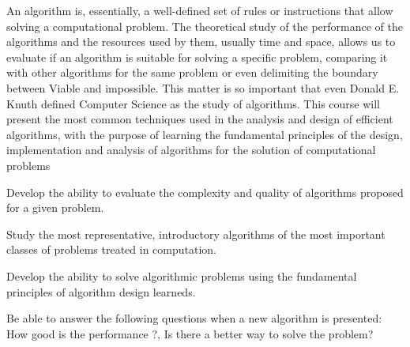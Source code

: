 \begin{syllabus}


\begin{justification}
An algorithm is, essentially, a well-defined set of rules or instructions that allow solving a computational problem.
The theoretical study of the performance of the algorithms and the resources used by them, usually time and space, allows us to evaluate if an algorithm is suitable for solving a specific problem, comparing it with other algorithms for the same problem or even delimiting the boundary between Viable and impossible.
This matter is so important that even Donald E. Knuth defined Computer Science as the study of algorithms.
This course will present the most common techniques used in the analysis and design of efficient algorithms,
with the purpose of learning the fundamental principles of the design, implementation and analysis of algorithms for the solution of computational problems
\end{justification}

\begin{goals} 
\item Develop the ability to evaluate the complexity and quality of algorithms proposed for a given problem.
\item Study the most representative, introductory algorithms of the most important classes of problems treated in computation.
\item Develop the ability to solve algorithmic problems using the fundamental principles of algorithm design learneds.
\item Be able to answer the following questions when a new algorithm is presented: How good is the performance ?, Is there a better way to solve the problem?
\end{goals}




\end{syllabus}
